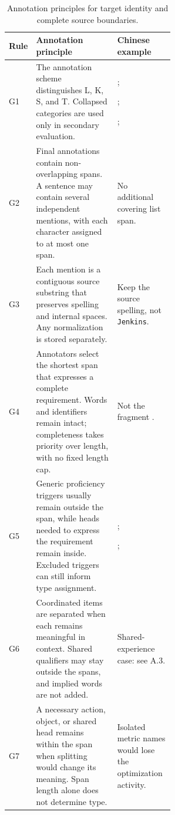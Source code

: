 \begingroup
\small\setlength{\tabcolsep}{4pt}\renewcommand{\arraystretch}{1.13}
\begin{table}[H]
\small
\caption{Annotation principles for target identity and complete source boundaries.}\label{tab:guide-boundaries}
\begin{tabular}{@{}P{0.07\linewidth}P{0.49\linewidth}P{\linewidth-16pt\relax}@{}}
\toprule\textbf{Rule} & \textbf{Annotation principle} & \textbf{Chinese example}\\\midrule

G1 & The annotation scheme distinguishes L, K, S, and T. Collapsed categories are used only in secondary evaluation. & ;\par\smallskip{};\par\smallskip{};  \\[5pt]
G2 & Final annotations contain non-overlapping spans. A sentence may contain several independent mentions, with each character assigned to at most one span. & \par\smallskip No additional covering list span. \\[5pt]
G3 & Each mention is a contiguous source substring that preserves spelling and internal spaces. Any normalization is stored separately. & \par\smallskip Keep the source spelling, not \texttt{Jenkins}. \\[5pt]
G4 & Annotators select the shortest span that expresses a complete requirement. Words and identifiers remain intact; completeness takes priority over length, with no fixed length cap. & \par\smallskip Not the fragment . \\[5pt]
G5 & Generic proficiency triggers usually remain outside the span, while heads needed to express the requirement remain inside. Excluded triggers can still inform type assignment. & ;\par\smallskip{};\par\smallskip{} \\[5pt]
G6 & Coordinated items are separated when each remains meaningful in context. Shared qualifiers may stay outside the spans, and implied words are not added. & \par\smallskip Shared-experience case: see A.3. \\[5pt]
G7 & A necessary action, object, or shared head remains within the span when splitting would change its meaning. Span length alone does not determine type. & \par\smallskip Isolated metric names would lose the optimization activity. \\
\bottomrule
\end{tabular}
\end{table}
